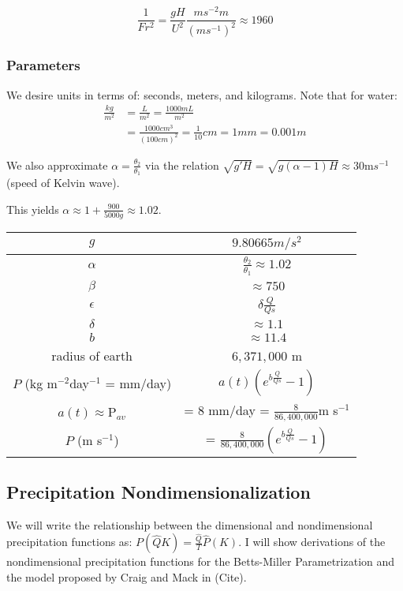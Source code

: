 \documentclass[10pt]{article}
\begin{document}
\begin{equation}
\frac{1}{Fr^2} = \frac{gH}{U^2} \frac{ms^{-2}m}{(ms^{-1})^2} \approx 1960
\end{equation}

\subsubsection*{Parameters}



We desire units in terms of: seconds, meters, and kilograms. Note that for water:
\begin{align*}
\frac{kg}{m^2} &= \frac{L}{m^2} = \frac{1000 mL}{m^2}\\
&= \frac{1000 cm^3}{ (100cm)^2} = \frac{1}{10} cm = 1 mm = 0.001 m 
\end{align*}

We also approximate $\alpha = \frac{\theta_2}{\theta_1}$ via the relation $\sqrt{g'H} = \sqrt{g(\alpha -1) H} \approx 30 $m$s^{-1}$ (speed of Kelvin wave).

This yields $\alpha \approx 1+\frac{900}{5000g} \approx 1.02$.


\begin{center}
	\begin{tabular}{ |c|c| } 
		\hline
		$g$  & $9.80665 m/s^2$ \\  \hline
		$\alpha$  & $\frac{\theta_2}{\theta_1}\approx 1.02$ \\ \hline
		$\beta$ &  $\approx 750$ \\ \hline
		$\epsilon$ &   $\delta \frac{Q}{Qs}$ \\ \hline
		$\delta$ & $ \approx 1.1$  \\ \hline
		$b$& $ \approx 11.4$\\ \hline
		radius of earth & $6,371,000$ m \\ \hline
		$P$ (kg m$^{-2}$day$^{-1}$ = mm/day)& $a(t)(e^{b\frac{Q}{Qs}}-1)$ \\ 
		$a(t)\approx $P$_{av}$ &= $8$ mm/day = $\frac{8}{86,400,000}$m s$^{-1}$ \\
		$P$ (m s$^{-1}$) &=  $\frac{8}{86,400,000}(e^{b\frac{Q}{Qs}}-1)$ \\  \hline
	\end{tabular}
\end{center}

\subsection*{Precipitation Nondimensionalization}
We will write the relationship between the dimensional and nondimensional precipitation functions as: $P(\hat{Q}K) = \frac{\hat{Q}}{T}\hat{P}(K)$.
I will show derivations of the nondimensional precipitation functions for the Betts-Miller Parametrization and the model proposed by Craig and Mack in (Cite).
\end{document}
